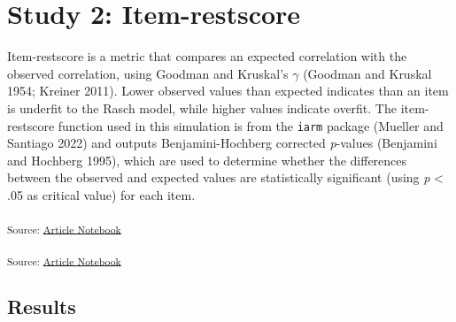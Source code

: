 \documentclass[
  letterpaper,
  DIV=11,
  numbers=noendperiod]{scrartcl}
\begin{document}
\section{Study 2: Item-restscore}\label{study-2-item-restscore}

Item-restscore is a metric that compares an expected correlation with
the observed correlation, using Goodman and Kruskal's \(\gamma\)
(Goodman and Kruskal 1954; Kreiner 2011). Lower observed values than
expected indicates than an item is underfit to the Rasch model, while
higher values indicate overfit. The item-restscore function used in this
simulation is from the \texttt{iarm} package (Mueller and Santiago 2022)
and outputs Benjamini-Hochberg corrected \emph{p}-values (Benjamini and
Hochberg 1995), which are used to determine whether the differences
between the observed and expected values are statistically significant
(using \emph{p} \textless{} .05 as critical value) for each item.

\textsubscript{Source:
\href{https://pgmj.github.io/rasch_itemfit/index.qmd.html}{Article
Notebook}}

\textsubscript{Source:
\href{https://pgmj.github.io/rasch_itemfit/index.qmd.html}{Article
Notebook}}

\subsection{Results}\label{results-1}
\end{document}

